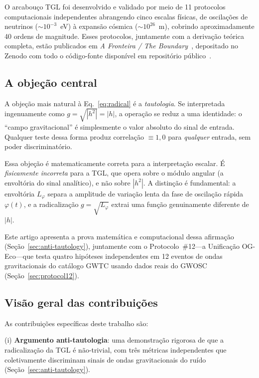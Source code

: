 \documentclass[12pt,a4paper,twocolumn]{article}
\begin{document}
O arcabouço TGL foi desenvolvido e validado por meio de 11 protocolos computacionais independentes abrangendo cinco escalas físicas, de oscilações de neutrinos ($\sim 10^{-3}$~eV) à expansão cósmica ($\sim 10^{26}$~m), cobrindo aproximadamente 40 ordens de magnitude. Esses protocolos, juntamente com a derivação teórica completa, estão publicados em \textit{A Fronteira / The Boundary}~\cite{Miguel2026Fronteira}, depositado no Zenodo com todo o código-fonte disponível em repositório público~\cite{Miguel2026GitHub}.

\subsection{A objeção central}

A objeção mais natural à Eq.~\eqref{eq:radical} é a \emph{tautologia}. Se interpretada ingenuamente como $g = \sqrt{|h^2|} = |h|$, a operação se reduz a uma identidade: o ``campo gravitacional'' é simplesmente o valor absoluto do sinal de entrada. Qualquer teste dessa forma produz correlação $\equiv 1{,}0$ para \emph{qualquer} entrada, sem poder discriminatório.

Essa objeção é matematicamente correta para a interpretação escalar. É \emph{fisicamente incorreta} para a TGL, que opera sobre o módulo angular (a envoltória do sinal analítico), e não sobre $|h^2|$. A distinção é fundamental: a envoltória $L_\varphi$ separa a amplitude de variação lenta da fase de oscilação rápida $\varphi(t)$, e a radicalização $g = \sqrt{L_\varphi}$ extrai uma função genuinamente diferente de $|h|$.

Este artigo apresenta a prova matemática e computacional dessa afirmação (Seção~\ref{sec:anti-tautology}), juntamente com o Protocolo~\#12---a Unificação OG-Eco---que testa quatro hipóteses independentes em 12 eventos de ondas gravitacionais do catálogo GWTC usando dados reais do GWOSC (Seção~\ref{sec:protocol12}).

\subsection{Visão geral das contribuições}

As contribuições específicas deste trabalho são:

(i) \textbf{Argumento anti-tautologia}: uma demonstração rigorosa de que a radicalização da TGL é não-trivial, com três métricas independentes que coletivamente discriminam sinais de ondas gravitacionais do ruído (Seção~\ref{sec:anti-tautology}).
\end{document}
